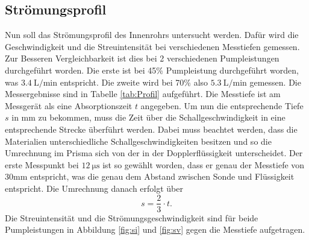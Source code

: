 \subsection{Strömungsprofil}
Nun soll das Strömungsprofil des Innenrohrs untersucht werden. Dafür wird die Geschwindigkeit und 
die Streuintensität bei verschiedenen Messtiefen gemessen. Zur Besseren Vergleichbarkeit ist dies bei 2 verschiedenen 
Pumpleistungen durchgeführt worden. Die erste ist bei 45\% Pumpleistung durchgeführt worden, was $\qty{3.4}{\liter\per\minute}$ entspricht.
Die zweite wird bei 70\% also $\qty{5.3}{\liter\per\minute}$ gemessen. Die Messergebnisse sind in Tabelle \ref{tab:Profil} aufgeführt.
Die Messtiefe ist am Messgerät als eine Absorptionszeit $t$ angegeben. Um nun die entsprechende Tiefe $s$ in mm zu bekommen, muss
die Zeit über die Schallgeschwindigkeit in eine entsprechende Strecke überführt werden. Dabei muss beachtet werden, dass die Materialien unterschiedliche
Schallgeschwindigkeiten besitzen und so die Umrechnung im Prisma sich von der in der Dopplerflüssigkeit unterscheidet. Der erste Messpunkt
bei $\qty{12}{\micro\second}$ ist so gewählt worden, dass er genau der Messtiefe von 30mm \cite{sample} entspricht, was die genau dem Abstand zwischen Sonde
und Flüssigkeit entspricht. Die Umrechnung danach erfolgt über
\begin{equation}
  s=\frac{2}{3}\cdot t.
\end{equation}
Die Streuintensität und die Strömungsgeschwindigkeit sind für beide Pumpleistungen in Abbildung \ref{fig:si} und \ref{fig:sv} gegen die Messtiefe aufgetragen. 
